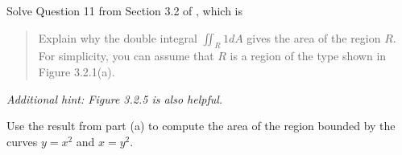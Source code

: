 \item  %
\BEN
\item Solve Question 11 from Section 3.2 of \VCT, which is
\begin{quotation}
\noindent
Explain why the double integral $\iint_R 1 dA$ gives the area of the region $R$. For simplicity, you can assume that $R$ is a region of the type shown in Figure 3.2.1(a).
\end{quotation}
\textit{Additional hint: Figure 3.2.5 is also helpful.}
\item Use the result from part (a) to compute the area of the region bounded by the curves $y = x^2$ and $x=y^2$.
\EEN

